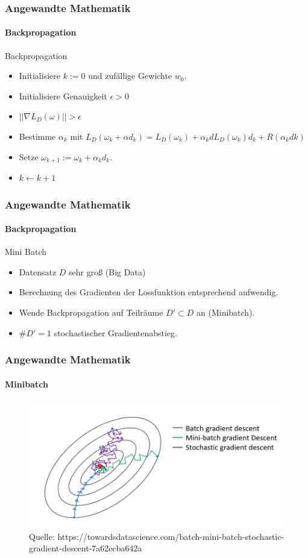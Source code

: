 \documentclass{beamer}
\begin{document}
\begin{frame}
    \frametitle{Angewandte Mathematik}
\framesubtitle{Backpropagation}
    \begin{block}{Backpropagation}
\begin{itemize}
\item  Initialisiere $k:=0$ und zufällige Gewichte $w_0$.
\item Initialisiere Genauigkeit $\epsilon > 0$
\item  {} {$|| \nabla L_D(\omega) || > \epsilon$}  
\item  Bestimme $\alpha_k$  mit $ L_D(\omega_k + \alpha d_k) =  L_D(\omega_k) + \alpha_k d L_D(\omega_k)d_k + R( \alpha_k dk)$ 
\item  Setze $\omega_{k+1} := \omega_k  + \alpha_k d_k$. 
\item $k \leftarrow k+1$
\end{itemize}
\end{block}
 \end{frame}

\begin{frame}
    \frametitle{Angewandte Mathematik}
\framesubtitle{Backpropagation}
    \begin{block}{Mini Batch}
\begin{itemize}
\item   Datensatz $D$ sehr groß (Big Data)
\item  Berechnung des Gradienten der Lossfunktion entsprechend aufwendig. 
\item  Wende Backpropagation auf Teilräume $D' \subset D$ an (Minibatch).
\item  $\#D' = 1$ stochastischer Gradientenabstieg.
\end{itemize}

\end{block}
 \end{frame}



\begin{frame}
    \frametitle{Angewandte Mathematik}
\framesubtitle{Minibatch}
\begin{figure}[H]
      \centering
    \includegraphics[width=1.0\textwidth]{images/batchgradient}
      \caption{Quelle: https://towardsdatascience.com/batch-mini-batch-stochastic-gradient-descent-7a62ecba642a}
\end{figure}

 \end{frame}
\end{document}
